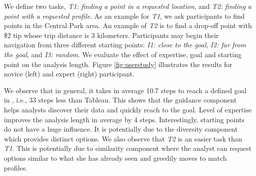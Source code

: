 We define two tasks, {\em T1: finding a point in a requested location}, and {\em T2: finding a point with a requested profile}. As an example for {\em T1}, we ask participants to find points in the Central Park area. An example of {\em T2} is to find a drop-off point with \$2 tip whose trip distance is 3 kilometers. Participants may begin their navigation from three different starting points: {\em I1: close to the goal}, {\em I2: far from the goal}, and {\em I3: random}. We evaluate the effect of expertise, goal and starting point on the analysis length. Figure \ref{fig:userstudy} illustrates the results for novice (left) and expert (right) participant.

We observe that in general, it takes in average 10.7 steps to reach a defined goal in \framework, i.e., 33 steps less than {\sc Tableau}. This shows that the guidance component helps analysts discover their data and quickly reach to the goal. Level of expertise improves the analysis length in average by 4 steps. Interestingly, starting points do not have a huge influence. It is potentially due to the diversity component which provides distinct options. We also observe that {\em T2} is an easier task than {\em T1}. This is potentially due to similarity component where the analyst can request options similar to what she has already seen and greedily moves to match profiles.

